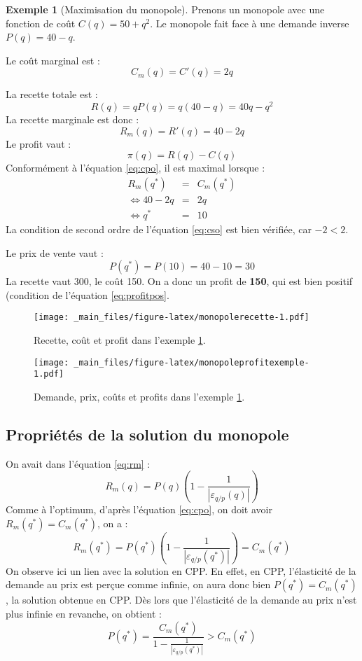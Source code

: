\documentclass[
]{book}
\theoremstyle{definition}
\theoremstyle{definition}
\newtheorem{example}{Exemple}[chapter]
\theoremstyle{definition}
\theoremstyle{definition}
\theoremstyle{remark}
\begin{document}
\begin{example}[Maximisation du monopole]
\protect\hypertarget{exm:monopoleexemple}{}\label{exm:monopoleexemple}Prenons un monopole avec une fonction de coût \(C(q)=50+q^2\).
Le monopole fait face à une demande inverse \(P(q) = 40-q\).

Le coût marginal est :
\[
C_m(q) = C'(q)=2q
\]

La recette totale est :
\[
R(q) = qP(q) = q(40-q) = 40q-q^2
\]
La recette marginale est donc :
\[
R_m(q) = R'(q) = 40 - 2q
\]
Le profit vaut :
\[
\pi(q) = R(q)-C(q)
\]
Conformément à l'équation \eqref{eq:cpo}, il est maximal lorsque :
\[
\begin{array}{rcl}
R_m(q^*) &=&C_m(q^*)\\
\Leftrightarrow 40 -2q &= &2q\\
\Leftrightarrow q^*&=&10
\end{array}
\]
La condition de second ordre de l'équation \eqref{eq:cso} est bien vérifiée, car \(-2<2\).

Le prix de vente vaut :
\[P(q^*) = P(10) = 40-10 = 30\]
La recette vaut 300, le coût 150.
On a donc un profit de \textbf{150}, qui est bien positif (condition de l'équation \eqref{eq:profitpos}.
\end{example}

\begin{figure}
\centering
\texttt{[image: \_main\_files/figure-latex/monopolerecette-1.pdf]}
\caption{\label{fig:monopolerecette}Recette, coût et profit dans l'exemple \ref{exm:monopoleexemple}.}
\end{figure}

\begin{figure}
\centering
\texttt{[image: \_main\_files/figure-latex/monopoleprofitexemple-1.pdf]}
\caption{\label{fig:monopoleprofitexemple}Demande, prix, coûts et profits dans l'exemple \ref{exm:monopoleexemple}.}
\end{figure}

\hypertarget{propriuxe9tuxe9s-de-la-solution-du-monopole}{%
\subsection{Propriétés de la solution du monopole}\label{propriuxe9tuxe9s-de-la-solution-du-monopole}}

On avait dans l'équation \eqref{eq:rm} :
\[
R_m(q) = P(q)\left(1 - \frac{1}{|\varepsilon_{q/p}(q)|}\right)
\]
Comme à l'optimum, d'après l'équation \eqref{eq:cpo}, on doit avoir \(R_m(q^*)=C_m(q^*)\), on a :
\[
R_m(q^*) = P(q^*)\left(1 - \frac{1}{|\varepsilon_{q/p}(q^*)|}\right) = C_m(q^*) 
\label{eq:rmcm}
\]
On observe ici un lien avec la solution en CPP.
En effet, en CPP, l'élasticité de la demande au prix est perçue comme infinie, on aura donc bien \(P(q^*) = C_m(q^*)\), la solution obtenue en CPP.
Dès lors que l'élasticité de la demande au prix n'est plus infinie en revanche, on obtient :
\[
 P(q^*)=\frac{C_m(q^*)}{1 - \frac{1}{\left|\varepsilon_{q/p}(q^*)\right|}} > C_m(q^*)
\]
\end{document}
